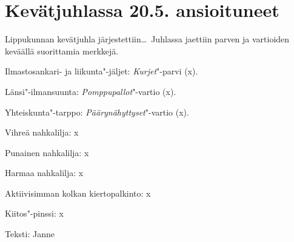\section{Kevätjuhlassa 20.5. ansioituneet}

\begin{multicols}{2}
\noindent Lippukunnan kevätjuhla järjestettiin\ldots\ Juhlassa jaettiin parven ja vartioiden keväällä suorittamia merkkejä.

Ilmastosankari- ja liikunta"-jäljet: \textit{Kurjet}"-parvi (x).

Länsi"-ilmansuunta: \textit{Pomppupallot}"-vartio (x).

Yhteiskunta"-tarppo: \textit{Päärynähyttyset}"-vartio (x).

Vihreä nahkalilja: x

Punainen nahkalilja: x

Harmaa nahkalilja: x

Aktiivisimman kolkan kiertopalkinto: x

Kiitos"-pinssi: x
\end{multicols}

\medskip

\noindent\null\hfill Teksti: Janne
